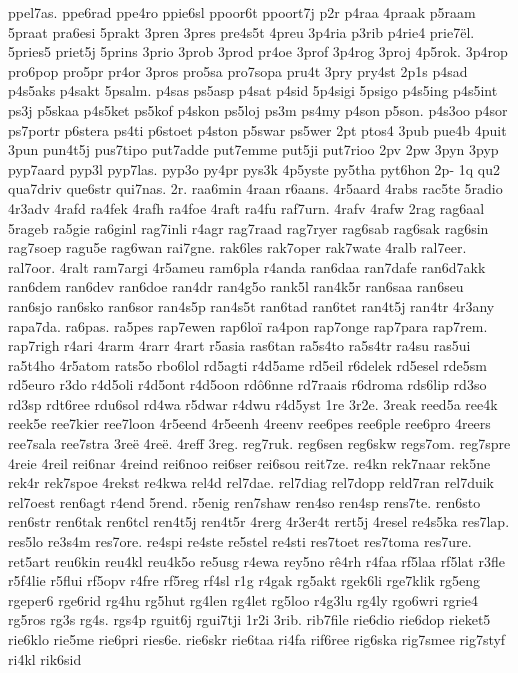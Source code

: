 {ppel7as.
ppe6rad
ppe4ro
ppie6sl
ppoor6t
ppoort7j
p2r
p4raa
4praak
p5raam
5praat
pra6esi
5prakt
3pren
3pres
pre4s5t
4preu
3p4ria
p3rib
p4rie4
prie7ël.
5pries5
priet5j
5prins
3prio
3prob
3prod
pr4oe
3prof
3p4rog
3proj
4p5rok.
3p4rop
pro6pop
pro5pr
pr4or
3pros
pro5sa
pro7sopa
pru4t
3pry
pry4st
2p1s
p4sad
p4s5aks
p4sakt
5psalm.
p4sas
ps5asp
p4sat
p4sid
5p4sigi
5psigo
p4s5ing
p4s5int
ps3j
p5skaa
p4s5ket
ps5kof
p4skon
ps5loj
ps3m
ps4my
p4son
p5son.
p4s3oo
p4sor
ps7portr
p6stera
ps4ti
p6stoet
p4ston
p5swar
ps5wer
2pt
ptos4
3pub
pue4b
4puit
3pun
pun4t5j
pus7tipo
put7adde
put7emme
put5ji
put7rioo
2pv
2pw
3pyn
3pyp
pyp7aard
pyp3l
pyp7las.
pyp3o
py4pr
pys3k
4p5yste
py5tha
pyt6hon
2p-
1q
qu2
qua7driv
que6str
qui7nas.
2r.
raa6min
4raan
r6aans.
4r5aard
4rabs
rac5te
5radio
4r3adv
4rafd
ra4fek
4rafh
ra4foe
4raft
ra4fu
raf7urn.
4rafv
4rafw
2rag
rag6aal
5rageb
ra5gie
ra6ginl
rag7inli
r4agr
rag7raad
rag7ryer
rag6sab
rag6sak
rag6sin
rag7soep
ragu5e
rag6wan
rai7gne.
rak6les
rak7oper
rak7wate
4ralb
ral7eer.
ral7oor.
4ralt
ram7argi
4r5ameu
ram6pla
r4anda
ran6daa
ran7dafe
ran6d7akk
ran6dem
ran6dev
ran6doe
ran4dr
ran4g5o
rank5l
ran4k5r
ran6saa
ran6seu
ran6sjo
ran6sko
ran6sor
ran4s5p
ran4s5t
ran6tad
ran6tet
ran4t5j
ran4tr
4r3any
rapa7da.
ra6pas.
ra5pes
rap7ewen
rap6loï
ra4pon
rap7onge
rap7para
rap7rem.
rap7righ
r4ari
4rarm
4rarr
4rart
r5asia
ras6tan
ra5s4to
ra5s4tr
ra4su
ras5ui
ra5t4ho
4r5atom
rats5o
rbo6lol
rd5agti
r4d5ame
rd5eil
r6delek
rd5esel
rde5sm
rd5euro
r3do
r4d5oli
r4d5ont
r4d5oon
rdô6nne
rd7raais
r6droma
rds6lip
rd3so
rd3sp
rdt6ree
rdu6sol
rd4wa
r5dwar
r4dwu
r4d5yst
1re
3r2e.
3reak
reed5a
ree4k
reek5e
ree7kier
ree7loon
4r5eend
4r5eenh
4reenv
ree6pes
ree6ple
ree6pro
4reers
ree7sala
ree7stra
3reë
4reë.
4reff
3reg.
reg7ruk.
reg6sen
reg6skw
regs7om.
reg7spre
4reie
4reil
rei6nar
4reind
rei6noo
rei6ser
rei6sou
reit7ze.
re4kn
rek7naar
rek5ne
rek4r
rek7spoe
4rekst
re4kwa
rel4d
rel7dae.
rel7diag
rel7dopp
reld7ran
rel7duik
rel7oest
ren6agt
r4end
5rend.
r5enig
ren7shaw
ren4so
ren4sp
rens7te.
ren6sto
ren6str
ren6tak
ren6tcl
ren4t5j
ren4t5r
4rerg
4r3er4t
rert5j
4resel
re4s5ka
res7lap.
res5lo
re3s4m
res7ore.
re4spi
re4ste
re5stel
re4sti
res7toet
res7toma
res7ure.
ret5art
reu6kin
reu4kl
reu4k5o
re5usg
r4ewa
rey5no
rê4rh
r4faa
rf5laa
rf5lat
r3fle
r5f4lie
r5flui
rf5opv
r4fre
rf5reg
rf4sl
r1g
r4gak
rg5akt
rgek6li
rge7klik
rg5eng
rgeper6
rge6rid
rg4hu
rg5hut
rg4len
rg4let
rg5loo
r4g3lu
rg4ly
rgo6wri
rgrie4
rg5ros
rg3s
rg4s.
rgs4p
rguit6j
rgui7tji
1r2i
3rib.
rib7file
rie6dio
rie6dop
rieket5
rie6klo
rie5me
rie6pri
ries6e.
rie6skr
rie6taa
ri4fa
rif6ree
rig6ska
rig7smee
rig7styf
ri4kl
rik6sid
}
